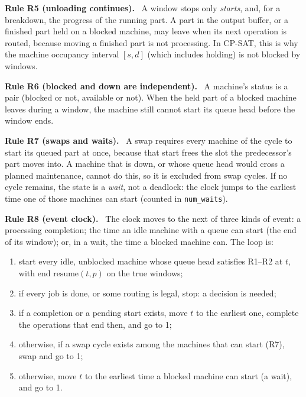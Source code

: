 \documentclass[11pt,a4paper]{article}
\newenvironment{adopted}[1]{%
  \par\medskip\noindent\textbf{\color{rule}Rule #1.}\ }{\par\medskip}
\newcommand{\code}[1]{\texttt{#1}}
\begin{document}
\begin{adopted}{R5 (unloading continues)}
A window stops only \emph{starts}, and, for a breakdown, the progress of the running part.
A part in the output buffer, or a finished part held on a blocked machine, may leave when its
next operation is routed, because moving a finished part is not processing. In CP-SAT, this is
why the machine occupancy interval $[s,d]$ (which includes holding) is not blocked by windows.
\end{adopted}

\begin{adopted}{R6 (blocked and down are independent)}
A machine's status is a pair (blocked or not, available or not). When the held part of a
blocked machine leaves during a window, the machine still cannot start its queue head
before the window ends.
\end{adopted}

\begin{adopted}{R7 (swaps and waits)}
A swap requires every machine of the cycle to start its queued part at once, because that start
frees the slot the predecessor's part moves into. A machine that is down, or whose queue head
would cross a planned maintenance, cannot do this, so it is excluded from swap cycles. If no
cycle remains, the state is a \emph{wait}, not a deadlock: the clock jumps to the earliest time
one of those machines can start (counted in \code{num\_waits}).
\end{adopted}

\begin{adopted}{R8 (event clock)}
The clock moves to the next of three kinds of event: a processing completion; the time an idle
machine with a queue can start (the end of its window); or, in a wait, the time a blocked
machine can. The loop is:
\begin{enumerate}[nosep]
  \item start every idle, unblocked machine whose queue head satisfies R1--R2 at $t$, with end
        $\mathrm{resume}(t,p)$ on the true windows;
  \item if every job is done, or some routing is legal, stop: a decision is needed;
  \item if a completion or a pending start exists, move $t$ to the earliest one, complete the
        operations that end then, and go to 1;
  \item otherwise, if a swap cycle exists among the machines that can start (R7), swap and go to 1;
  \item otherwise, move $t$ to the earliest time a blocked machine can start (a wait), and go to 1.
\end{enumerate}
\end{adopted}
\end{document}
